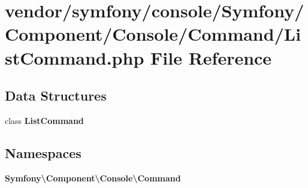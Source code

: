 \section{vendor/symfony/console/\+Symfony/\+Component/\+Console/\+Command/\+List\+Command.php File Reference}
\label{symfony_2console_2_symfony_2_component_2_console_2_command_2_list_command_8php}
\subsection*{Data Structures}
\begin{DoxyCompactItemize}
\item 
class {\bf List\+Command}
\end{DoxyCompactItemize}
\subsection*{Namespaces}
\begin{DoxyCompactItemize}
\item 
 {\bf Symfony\textbackslash{}\+Component\textbackslash{}\+Console\textbackslash{}\+Command}
\end{DoxyCompactItemize}
